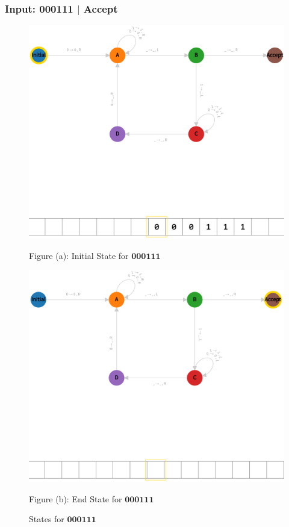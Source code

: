 \vspace*{\fill}

\subsubsection*{Input: 000111 $|$ Accept}
\label{q1-000111}

\begin{figure}[ht]
  \centering
  \begin{minipage}{.49\linewidth}
    \centering
    \includegraphics[width=\linewidth]{answers/img/q1-000111-initial.png}
    \caption*{Figure (a): Initial State for $\mathbf{000111}$}
    \label{fig:000111-initial}
  \end{minipage}
  \begin{minipage}{.49\linewidth}
    \centering
    \includegraphics[width=\linewidth]{answers/img/q1-000111-end.png}
    \caption*{Figure (b): End State for $\mathbf{000111}$}
    \label{fig:000111-end}
  \end{minipage}
  \caption{States for $\mathbf{000111}$}
  \label{fig:in-000111}
\end{figure}


